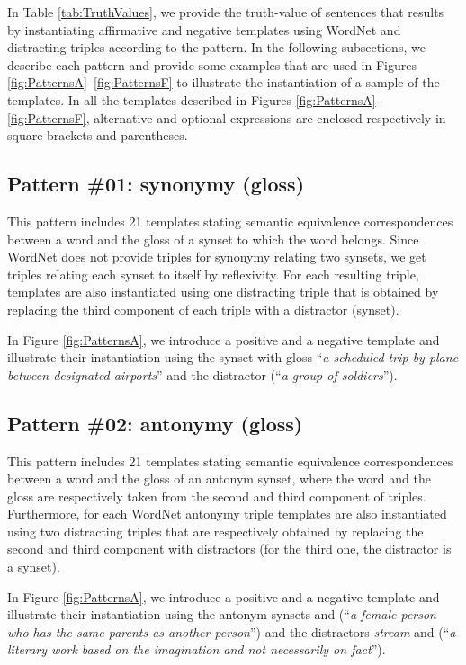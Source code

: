 \documentclass[11pt]{article}
\newcommand{\WORDNET}{WordNet}
\begin{document}
In Table \ref{tab:TruthValues}, we provide the truth-value of sentences that results by instantiating affirmative and negative templates using \WORDNET{} and distracting triples according to the pattern. In the following subsections, we describe each pattern and provide some examples that are used in Figures \ref{fig:PatternsA}--\ref{fig:PatternsF} to illustrate the instantiation of a sample of the templates. In all the templates described in Figures \ref{fig:PatternsA}--\ref{fig:PatternsF}, alternative and optional expressions are enclosed respectively in square brackets and parentheses.

\subsection{Pattern \#01: synonymy (gloss)}

This pattern includes 21 templates stating semantic equivalence correspondences between a word and the gloss of a synset to which the word belongs. Since \WORDNET{} does not provide triples for synonymy relating two synsets, we get triples relating each synset to itself by reflexivity. For each resulting triple, templates are also instantiated using one distracting triple that is obtained by replacing the third component of each triple with a distractor (synset).

In Figure \ref{fig:PatternsA}, we introduce a positive and a negative template and illustrate their instantiation using the synset  with gloss ``{\it a scheduled trip by plane between designated airports}'' and the distractor  (``{\it a group of soldiers}'').

\subsection{Pattern \#02: antonymy (gloss)}

This pattern includes 21 templates stating semantic equivalence correspondences between a word and the gloss of an antonym synset, where the word and the gloss are respectively taken from the second and third component of triples. Furthermore, for each \WORDNET{} antonymy triple templates are also instantiated using two distracting triples that are respectively obtained by replacing the second and third component with distractors (for the third one, the distractor is a synset).

In Figure \ref{fig:PatternsA}, we introduce a positive and a negative template and illustrate their instantiation using the antonym synsets  and  (``{\it a female person who has the same parents as another person}'') and the distractors {\it stream} and  (``{\it a literary work based on the imagination and not necessarily on fact}'').
\end{document}
